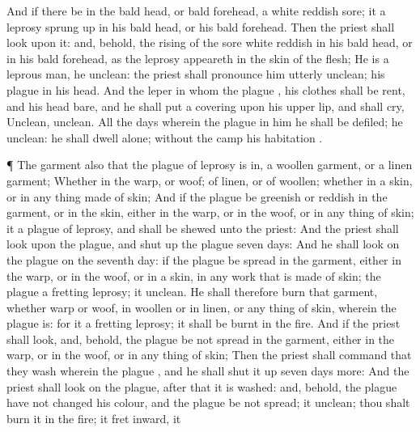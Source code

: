 {And if there be in the bald
head, or bald
forehead, a
white
reddish
sore; it
{} a
leprosy
sprung up in his bald
head, or his bald
forehead.
Then the
priest shall
look upon it: and, behold,
{} the
rising of the
sore
{}
white
reddish in his bald
head, or in his bald
forehead, as the
leprosy
appeareth in the
skin of the
flesh;
He is a
leprous
man, he
{}
unclean: the
priest shall pronounce him
utterly
unclean; his
plague
{} in his
head.
And the
leper in whom the
plague
{}, his
clothes shall be
rent, and his
head
bare, and he shall put a
covering upon his upper
lip, and shall
cry,
Unclean,
unclean.
All the
days wherein the
plague
{} in him he shall be
defiled; he
{}
unclean: he shall
dwell
alone;
without the
camp
{} his
habitation
{}.
\par }{\PP {}¶ The
garment also that the
plague of
leprosy is in,
{} a
woollen
garment, or a
linen
garment;
Whether
{} in the
warp, or
woof; of
linen, or of
woollen; whether in a
skin, or in any thing
made of
skin;
And if the
plague be
greenish or
reddish in the
garment, or in the
skin,
either in the
warp, or in the
woof, or in any
thing of
skin; it
{} a
plague of
leprosy, and shall be
shewed unto the
priest:
And the
priest shall
look upon the
plague, and
shut up
{} the
plague
seven
days:
And he shall
look on the
plague on the
seventh
day: if the
plague be
spread in the
garment, either in the
warp, or in the
woof, or in a
skin,
{} in any
work that is
made of
skin; the
plague
{} a
fretting
leprosy; it
{}
unclean.
He shall therefore
burn that
garment, whether
warp or
woof, in
woollen or in
linen, or any
thing of
skin, wherein the
plague is: for it
{} a
fretting
leprosy; it shall be
burnt in the
fire.
And if the
priest shall
look, and, behold, the
plague be not
spread in the
garment,
either in the
warp,
or in the
woof,
or in any
thing of
skin;
Then the
priest shall
command that they
wash
{} wherein the
plague
{}, and he shall
shut it up
seven
days
more:
And the
priest shall
look on the
plague,
after that it is
washed: and, behold,
{} the
plague have not
changed his
colour, and the
plague be not
spread; it
{}
unclean; thou shalt
burn it in the
fire; it
{}
fret inward,
{} it
}
